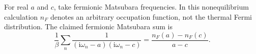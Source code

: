 \documentclass{article}
\begin{document}
For real $a$ and $c$, take fermionic Matsubara frequencies.  In this
nonequilibrium calculation $n_F$ denotes an arbitrary occupation function,
not the thermal Fermi distribution.  The claimed fermionic Matsubara sum is
\begin{equation}
\frac{1}{\beta}\sum_n \frac{1}{(\mathrm{i}\omega_n-a)(\mathrm{i}\omega_n-c)}
= \frac{n_F(a)-n_F(c)}{a-c} .
\label{eq:redefined-fermi-symbol}
\end{equation}
\end{document}
